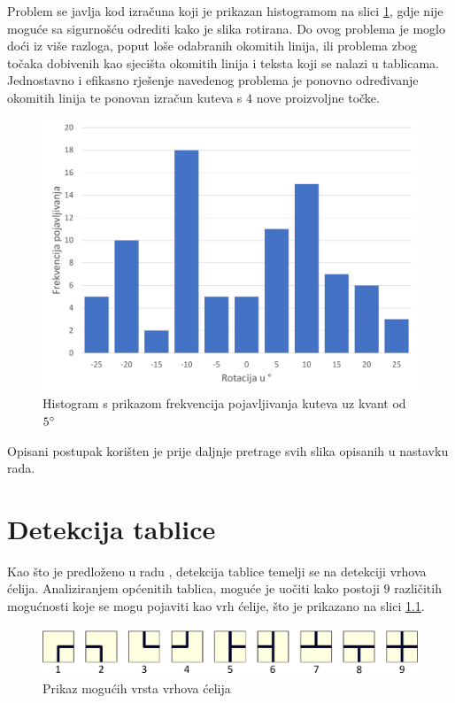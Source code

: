 \documentclass[times, utf8, zavrsni, numeric]{fer}
\begin{document}
Problem se javlja kod izračuna koji je prikazan histogramom na slici \ref{fig:skew3}, gdje nije moguće sa sigurnošću odrediti kako je slika rotirana.
Do ovog problema je moglo doći iz više razloga, poput loše odabranih okomitih linija, ili problema zbog točaka dobivenih kao sjecišta okomitih linija i teksta koji se nalazi u tablicama.
Jednostavno i efikasno rješenje navedenog problema je ponovno određivanje okomitih linija te ponovan izračun kuteva s $4$ nove proizvoljne točke.

\begin{figure}[ht!]
    \centering
    \includegraphics[width=.8\textwidth]{Images/Skew3.pdf}
    \captionsetup{justification=centering}
    \caption{Histogram s prikazom frekvencija pojavljivanja kuteva uz kvant od $5\degree$}
    \label{fig:skew3}
\end{figure}

Opisani postupak korišten je prije daljnje pretrage svih slika opisanih u nastavku rada.

\chapter{Detekcija tablice}
\label{ch:tableDetection}
Kao što je predloženo u radu \cite{conference:AutomaticTableDetectionInDocumentImages}, detekcija tablice temelji se na detekciji vrhova ćelija. 
Analiziranjem općenitih tablica, moguće je uočiti kako postoji $9$ različitih mogućnosti koje se mogu pojaviti kao vrh ćelije, što je prikazano na slici \ref{fig:corners}.

\begin{figure}[ht!]
    \centering
    \includegraphics[width=1.0\textwidth]{Images/Corners.pdf}
    \captionsetup{justification=centering}
    \caption{Prikaz mogućih vrsta vrhova ćelija}
    \label{fig:corners}
\end{figure}
\end{document}

